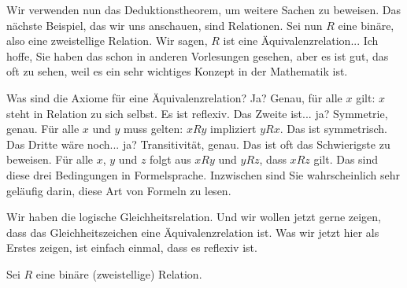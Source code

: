 \begin{spoken-clean}[00:51:37 - 00:54:25]
Wir verwenden nun das Deduktionstheorem, um weitere Sachen zu beweisen. Das nächste Beispiel, das wir uns anschauen, sind Relationen. Sei nun $R$ eine binäre, also eine zweistellige Relation. Wir sagen, $R$ ist eine Äquivalenzrelation... Ich hoffe, Sie haben das schon in anderen Vorlesungen gesehen, aber es ist gut, das oft zu sehen, weil es ein sehr wichtiges Konzept in der Mathematik ist.

Was sind die Axiome für eine Äquivalenzrelation? Ja? Genau, für alle $x$ gilt: $x$ steht in Relation zu sich selbst. Es ist reflexiv. Das Zweite ist... ja? Symmetrie, genau. Für alle $x$ und $y$ muss gelten: $x R y$ impliziert $y R x$. Das ist symmetrisch. Das Dritte wäre noch... ja? Transitivität, genau. Das ist oft das Schwierigste zu beweisen. Für alle $x$, $y$ und $z$ folgt aus $x R y$ und $y R z$, dass $x R z$ gilt. Das sind diese drei Bedingungen in Formelsprache. Inzwischen sind Sie wahrscheinlich sehr geläufig darin, diese Art von Formeln zu lesen.

Wir haben die logische Gleichheitsrelation. Und wir wollen jetzt gerne zeigen, dass das Gleichheitszeichen eine Äquivalenzrelation ist. Was wir jetzt hier als Erstes zeigen, ist einfach einmal, dass es reflexiv ist.
\end{spoken-clean}

\begin{math-stroke}
Sei $R$ eine binäre (zweistellige) Relation.
\end{math-stroke}

